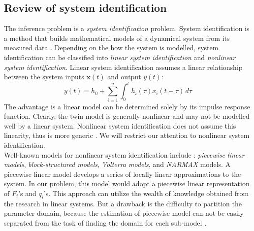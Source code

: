 \documentclass[a4paper,onecolumn]{article}
\theoremstyle{remark}
\begin{document}
\subsection{Review of system identification}
\label{SI review}
\noindent The inference problem is a \emph{system identification} problem. System identification is
a method that builds mathematical models of a
dynamical system from its measured data \cite{SI old}.
Depending on the how the system is modelled, system identification 
can be classified into \emph{linear system identification} and
\emph{nonlinear system identification}. Linear system identification assumes a linear
relationship between the system inputs $\mathbf{x}(t)$ and output $y(t)$:
\begin{equation}
    y(t) = h_0 + \sum_{i=1}^n \int_0^t h_i(\tau) x_i(t-\tau) \, d\tau
    \label{linear dynamic}
\end{equation}
The advantage is a linear model can be determined solely by its
impulse response function.
Clearly, the twin model
is generally nonlinear and may not be modelled well by a linear system.
Nonlinear system identification does not assume this linearity, thus is more generic
\cite{NARMAXbook}.
We will restrict our attention to nonlinear system identification.\\

\noindent Well-known models for nonlinear system identification include
\cite{NARMAXbook}: \emph{piecewise linear models},
\emph{block-structured models}, 
\emph{Volterra models}, and \emph{NARMAX} models. 
A piecewise linear model develops a series of locally linear approximations
to the system. In our problem, this model would adopt a piecewise linear 
representation of $F_i$'s and $q_i$'s. 
This approach can utilize the wealth of knowledge obtained from the research in linear systems.
But a drawback is the difficulty to partition the parameter domain, because
the estimation of piecewise model can not be easily separated from the task of finding the
domain for each sub-model \cite{piecewise linear}.\\
\end{document}

